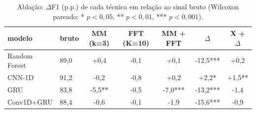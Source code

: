 \begin{table}[t]
\centering\footnotesize
\caption{Ablação: $\Delta$F1 (p.p.) de cada técnica em relação ao sinal bruto (Wilcoxon pareado: * $p<0{,}05$, ** $p<0{,}01$, *** $p<0{,}001$).}\label{tab:ablacao}
\begin{tabular}{llccccc}
\toprule
modelo & bruto & MM (k=3) & FFT (K=10) & MM + FFT & $\Delta$ & X + $\Delta$ \\
\midrule
Random Forest & 89{,}0 & +0{,}4 & -0{,}1 & +0{,}1 & -12{,}5*** & +0{,}2 \\
CNN-1D & 91{,}2 & -0{,}2 & -0{,}8 & +0{,}2 & +2{,}2* & +1{,}5** \\
GRU & 83{,}8 & -5{,}5** & -0{,}5 & -7{,}0*** & -13{,}2*** & -1{,}4 \\
Conv1D+GRU & 88{,}4 & -0{,}6 & -0{,}1 & -1{,}9 & -15{,}6*** & -0{,}9 \\
\bottomrule
\end{tabular}
\end{table}